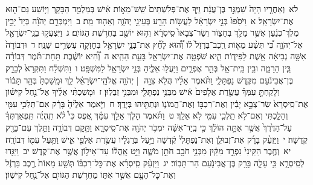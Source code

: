 \documentclass[18pt]{article}
\newcommand{\kri}[1]{\Afootnote{#1}}	%
\begin{document}
 {\loc לא~}וְאַחֲרָ֤יו הָיָה֙ שַׁמְגַּ֣ר בֶּן־עֲנָ֔ת וַיַּ֤ךְ אֶת־פְּלִשְׁתִּים֙ שֵֽׁשׁ־מֵא֣וֹת אִ֔ישׁ בְּמַלְמַ֖ד הַבָּקָ֑ר וַיּ֥וֹשַׁע גַּם־ה֖וּא אֶת־יִשְׂרָאֵֽל׃ 
\startlock
 {\loc א~}וַיֹּסִ֙פוּ֙ בְּנֵ֣י יִשְׂרָאֵ֔ל לַעֲשׂ֥וֹת הָרַ֖ע בְּעֵינֵ֣י יְהֹוָ֑ה וְאֵה֖וּד מֵֽת׃ \startlock
 {\loc ב~}וַיִּמְכְּרֵ֣ם יְהֹוָ֗ה בְּיַד֙ יָבִ֣ין מֶלֶךְ־כְּנַ֔עַן אֲשֶׁ֥ר מָלַ֖ךְ בְּחָצ֑וֹר וְשַׂר־צְבָאוֹ֙ סִֽיסְרָ֔א וְה֥וּא יוֹשֵׁ֖ב בַּחֲרֹ֥שֶׁת הַגּוֹיִֽם׃ \startlock
 {\loc ג~}וַיִּצְעֲק֥וּ בְנֵֽי־יִשְׂרָאֵ֖ל אֶל־יְהֹוָ֑ה כִּ֠י תְּשַׁ֨ע מֵא֤וֹת רֶֽכֶב־בַּרְזֶל֙ ל֔וֹ וְ֠ה֠וּא לָחַ֞ץ אֶת־בְּנֵ֧י יִשְׂרָאֵ֛ל בְּחׇזְקָ֖ה עֶשְׂרִ֥ים שָׁנָֽה׃ \startlock
 {\loc ד~}וּדְבוֹרָה֙ אִשָּׁ֣ה נְבִיאָ֔ה אֵ֖שֶׁת לַפִּיד֑וֹת הִ֛יא שֹׁפְטָ֥ה אֶת־יִשְׂרָאֵ֖ל בָּעֵ֥ת הַהִֽיא׃ \startlock
 {\loc ה~}וְ֠הִ֠יא יוֹשֶׁ֨בֶת תַּחַת־תֹּ֜מֶר דְּבוֹרָ֗ה בֵּ֧ין הָרָמָ֛ה וּבֵ֥ין בֵּֽית־אֵ֖ל בְּהַ֣ר אֶפְרָ֑יִם וַיַּעֲל֥וּ אֵלֶ֛יהָ בְּנֵ֥י יִשְׂרָאֵ֖ל לַמִּשְׁפָּֽט׃ \startlock
 {\loc ו~}וַתִּשְׁלַ֗ח וַתִּקְרָא֙ לְבָרָ֣ק בֶּן־אֲבִינֹ֔עַם מִקֶּ֖דֶשׁ נַפְתָּלִ֑י וַתֹּ֨אמֶר אֵלָ֜יו הֲלֹ֥א צִוָּ֣ה  |  יְהֹוָ֣ה אֱלֹהֵֽי־יִשְׂרָאֵ֗ל לֵ֤ךְ וּמָֽשַׁכְתָּ֙ בְּהַ֣ר תָּב֔וֹר וְלָקַחְתָּ֣ עִמְּךָ֗ עֲשֶׂ֤רֶת אֲלָפִים֙ אִ֔ישׁ מִבְּנֵ֥י נַפְתָּלִ֖י וּמִבְּנֵ֥י זְבֻלֽוּן׃ \startlock
 {\loc ז~}וּמָשַׁכְתִּ֨י אֵלֶ֜יךָ אֶל־נַ֣חַל קִישׁ֗וֹן אֶת־סִֽיסְרָא֙ שַׂר־צְבָ֣א יָבִ֔ין וְאֶת־רִכְבּ֖וֹ וְאֶת־הֲמוֹנ֑וֹ וּנְתַתִּ֖יהוּ בְּיָדֶֽךָ׃ \startlock
 {\loc ח~}וַיֹּ֤אמֶר אֵלֶ֙יהָ֙ בָּרָ֔ק אִם־תֵּלְכִ֥י עִמִּ֖י וְהָלָ֑כְתִּי וְאִם־לֹ֥א תֵֽלְכִ֛י עִמִּ֖י לֹ֥א אֵלֵֽךְ׃ \startlock
 {\loc ט~}וַתֹּ֜אמֶר הָלֹ֧ךְ אֵלֵ֣ךְ עִמָּ֗ךְ אֶ֚פֶס כִּי֩ לֹ֨א תִֽהְיֶ֜ה תִּֽפְאַרְתְּךָ֗ עַל־הַדֶּ֙רֶךְ֙ אֲשֶׁ֣ר אַתָּ֣ה הוֹלֵ֔ךְ כִּ֣י בְֽיַד־אִשָּׁ֔ה יִמְכֹּ֥ר יְהֹוָ֖ה אֶת־סִֽיסְרָ֑א וַתָּ֧קׇם דְּבוֹרָ֛ה וַתֵּ֥לֶךְ עִם־בָּרָ֖ק קֶֽדְשָׁה׃ \startlock
 {\loc י~}וַיַּזְעֵ֨ק בָּרָ֜ק אֶת־זְבוּלֻ֤ן וְאֶת־נַפְתָּלִי֙ קֶ֔דְשָׁה וַיַּ֣עַל בְּרַגְלָ֔יו עֲשֶׂ֥רֶת אַלְפֵ֖י אִ֑ישׁ וַתַּ֥עַל עִמּ֖וֹ דְּבוֹרָֽה׃ \startlock
 {\loc יא~}וְחֶ֤בֶר הַקֵּינִי֙ נִפְרָ֣ד מִקַּ֔יִן מִבְּנֵ֥י חֹבָ֖ב חֹתֵ֣ן מֹשֶׁ֑ה וַיֵּ֣ט  אׇֽהֳל֔וֹ  עַד־אֵיל֥וֹן  \edtext{(בצענים)}{\kri{קרי: בְּצַעֲנַנִּ֖ים}}  אֲשֶׁ֥ר אֶת־קֶֽדֶשׁ׃ \startlock
 {\loc יב~}וַיַּגִּ֖דוּ לְסִֽיסְרָ֑א כִּ֥י עָלָ֛ה בָּרָ֥ק בֶּן־אֲבִינֹ֖עַם הַר־תָּבֽוֹר׃ \startlock
 {\loc יג~}וַיַּזְעֵ֨ק סִֽיסְרָ֜א אֶת־כׇּל־רִכְבּ֗וֹ תְּשַׁ֤ע מֵאוֹת֙ רֶ֣כֶב בַּרְזֶ֔ל וְאֶת־כׇּל־הָעָ֖ם אֲשֶׁ֣ר אִתּ֑וֹ מֵחֲרֹ֥שֶׁת הַגּוֹיִ֖ם אֶל־נַ֥חַל קִישֽׁוֹן׃ \startlock
\end{document}
